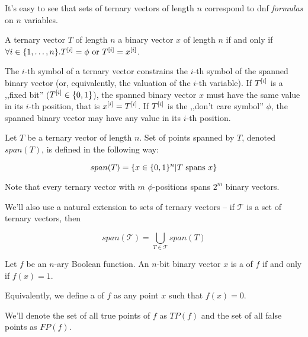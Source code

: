 It's easy to see that sets of ternary vectors of length $n$
correspond to \acrshort{dnf} \emph{formulas}
on $n$ variables.

\begin{definition}[Spanning]
A ternary vector $T$ of length $n$ 
a binary vector $x$ of length $n$
if and only if
$\forall i \in \{1, \ldots, n\} .
T^{[i]} = \phi \text{ or } T^{[i]} = x^{[i]}$.
\end{definition}

The $i$-th symbol of a ternary vector
constrains the $i$-th symbol of the spanned binary vector
(or, equivalently, the valuation of the $i$-th variable).
If $T^{[i]}$ is a ,,fixed bit''
($T^{[i]} \in \{0, 1\}$),
the spanned binary vector $x$
must have the same value
in its $i$-th position,
that is $x^{[i]} = T^{[i]}$.
If $T^{[i]}$ is the ,,don't care symbol'' $\phi$,
the spanned binary vector
may have any value in its $i$-th position.

\begin{definition}
Let $T$ be a ternary vector of length $n$.
Set of points spanned by $T$,
denoted $span(T)$,
is defined in the following way:

\begin{equation*}
span(T) = \{
x \in \{0, 1\}^n |
T\text{ spans }x
\}
\end{equation*}
\end{definition}

Note that every ternary vector
with $m$ $\phi$-positions
spans $2^m$ binary vectors.

We'll also use a natural extension
to sets of ternary vectors --
if $\mathcal{T}$ is a set of ternary vectors, then

\begin{equation*}
span(\mathcal{T}) =
\bigcup_{T \in \mathcal{T}} span(T)
\end{equation*}

\begin{definition}
Let $f$ be an $n$-ary Boolean function.
An $n$-bit binary vector $x$ is a 
of $f$ if and only if $f(x)  = 1$.
\end{definition}

Equivalently,
we define a  of $f$
as any point $x$
such that $f(x) = 0$.

We'll denote the set of all true points of $f$ as $TP(f)$
and the set of all false points as $FP(f)$.

